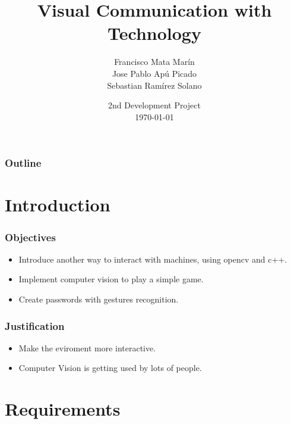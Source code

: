 \documentclass{beamer}
\title[Visual Communication]{Visual Communication with Technology}
\author[Grupo - Renekton]{
  Francisco Mata Marín\\
  Jose Pablo Apú Picado\\
  Sebastian Ramírez Solano\\\medskip
  }
\institute[University of Costa Rica]{
  Electrical Engineering School \\
  IE-0117 - Programación Bajo Plataformas Abiertas}
\date[\today]{
  2nd Development Project \\
  \today}
\begin{document}
\begin{frame}
  \titlepage
\end{frame}

\begin{frame}
  \frametitle{Outline}
  \tableofcontents
\end{frame}

\section{Introduction}

\begin{frame}
\frametitle{Objectives}
\begin{itemize}
\item Introduce another way to interact with machines, using opencv and c++.
\item Implement computer vision to play a simple game.
\item Create passwords with gestures recognition.
\end{itemize}
\end{frame}
\begin{frame}
\frametitle{Justification}
\begin{itemize}
\item Make the eviroment more interactive. 
\item Computer Vision is getting used by lots of people.  
\end{itemize}
\end{frame}
\section{Requirements}
\end{document}
